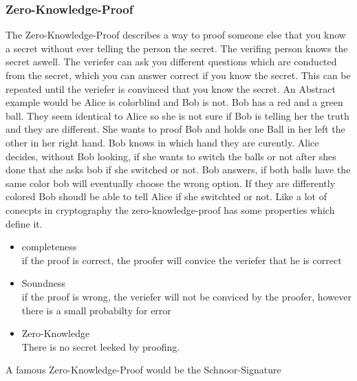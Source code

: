 \documentclass[journal]{IEEEtran}
\begin{document}
\subsubsection{Zero-Knowledge-Proof}
    The Zero-Knowledge-Proof describes a way to proof someone else that you know a secret without ever telling the person the secret. The verifing person knows the secret aswell.
    The veriefer can ask you different questions which are conducted from the secret, which you can answer correct if you know the secret.
    This can be repeated until the veriefer is convinced that you know the secret.
    An Abstract example would be Alice is colorblind and Bob is not. 
    Bob has a red and a green ball. They seem identical to Alice so she is not sure if Bob is telling her the truth and they are different.
    She wants to proof Bob and holds one Ball in her left the other in her right hand. Bob knows in which hand they are curently.
    Alice decides, without Bob looking, if she wants to switch the balls or not after shes done that she asks bob if she switched or not.
    Bob answers, if both balls have the same color bob will eventually choose the wrong option. If they are differently colored Bob shoudl be able to tell Alice if she switchted or not.
    Like a lot of conecpts in cryptography the zero-knowledge-proof has some properties which define it.
    \begin{itemize}[]
        \item completeness \\
        if the proof is correct, the proofer will convice the veriefer that he is correct
        \item Soundness \\
        if the proof is wrong, the veriefer will not be conviced by the proofer, however there is a small probabilty for error
        \item Zero-Knowledge \\
        There is no secret leeked by proofing.
    \end{itemize}
    A famous Zero-Knowledge-Proof would be the Schnoor-Signature
\end{document}
